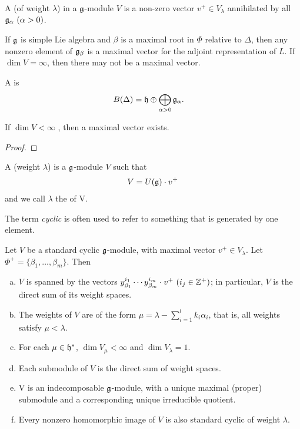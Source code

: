 A  (of weight $\lambda$) in a $\mathfrak{g}$-module $V$ is a non-zero vector $v^+\in V_\lambda$ annihilated by all $\mathfrak{g}_\alpha\ (\alpha > 0)$. 

\begin{insight}
    If $\mathfrak{g}$ is simple Lie algebra and $\beta$ is a maximal root in $\Phi$ relative to $\Delta$, then any nonzero element of $\mathfrak{g}_\beta$ is a maximal vector for the adjoint representation of $L$.
    If $\dim V = \infty$, then there may not be a maximal vector.
\end{insight}


A  is
\begin{align}
    B(\Delta) &= \mathfrak{h}\oplus \bigoplus_{\alpha>0} \mathfrak{g}_\alpha.
\end{align}
\begin{lemma}
    If $\dim V < \infty$ , then a maximal vector exists.
\end{lemma}
\begin{proof}
\end{proof}


A  (weight $\lambda$) is a $\mathfrak{g}$-module $V$ such that 
\begin{align*}
    V=U(\mathfrak{g})\cdot v^+
\end{align*}
and we call $\lambda$ the  of V. 
\begin{insight}
    The term \emph{cyclic} is often used to refer to something that is generated by one element.
\end{insight}

\begin{theorem} 
    Let $V$ be a standard cyclic $\mathfrak{g}$-module, with maximal vector $v^+\in V_\lambda$. Let $\Phi^+=\{\beta_1,\dotsc,\beta_m\}$. Then
    \begin{enumerate}[(a)]
        \makethislistcompact
        \item $V$ is spanned by the vectors $y_{\beta_1}^{i_1}\cdots y_{\beta_m}^{i_m}\cdot v^+\ (i_j\in \ZZ^+)$; in particular, $V$ is the direct sum of its weight spaces.
        \item  The weights of $V$ are of the form $\mu = \lambda - \sum_{i=1}^{l}k_i \alpha_i$,  that is, all weights satisfy $\mu < \lambda$.
        \item For each $\mu \in \mathfrak{h}^*$, $\dim V_\mu < \infty$ and $\dim V_\lambda = 1$.
        \item Each submodule of $V$ is the direct sum of weight spaces.
        \item V is an indecomposable $\mathfrak{g}$-module, with a unique maximal (proper) submodule and a corresponding unique irreducible quotient.
        \item Every nonzero homomorphic image of $V$ is also standard cyclic of weight $\lambda$.
    \end{enumerate}
\end{theorem}

